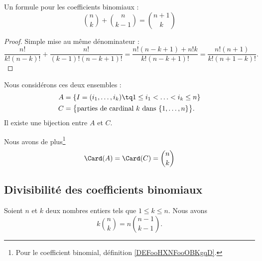 \begin{lemma}		\label{LEMooHWMNooIINsxu}
	Un formule pour les coefficients binomiaux :
	\begin{equation}
		{n\choose k}+{n\choose k-1}={n+1\choose k}
	\end{equation}
\end{lemma}

\begin{proof}
	Simple mise au même dénominateur :
	\begin{equation}
		\frac{ n! }{ k!(n-k)! }+\frac{ n! }{ (k-1)!(n-k+1)! }=\frac{ n!(n-k+1)+n!k }{ k!(n-k+1)! }=\frac{ n!(n+1) }{  k!(n+1-k)!  }.
	\end{equation}
\end{proof}

\begin{lemma}		\label{LEMooUTDTooXAmvdF}
	Nous considérons ces deux ensembles :
	\begin{subequations}
		\begin{align}
			A & =\{ I=(i_1,\ldots,i_k)\tq 1\leq i_1<\ldots <i_k\leq n \}                     \\
			C & =\big\{ \text{parties de cardinal \( k\) dans \( \{ 1,\ldots,n \}\)} \big\}.
		\end{align}
	\end{subequations}
	Il existe une bijection entre \( A\) et \( C\).

	Nous avons de plus\footnote{Pour le coefficient binomial, définition \ref{DEFooHXNFooOBKgqD}.}
	\begin{equation}        \label{EQooSPVNooHoPnOe}
		\Card(A)=\Card(C)={n\choose k}
	\end{equation}
\end{lemma}


\subsection{Divisibilité des coefficients binomiaux}

\begin{lemma}	\label{LEMooYBOIooEtVfDQ}
	Soient \( n\) et \( k\) deux nombres entiers tels que \( 1\leq k\leq n\). Nous avons
	\begin{equation}		\label{EQooDNBYooZfJEAe}
		k\binom{ n }{ k }=n\binom{ n-1 }{ k-1 }.
	\end{equation}
\end{lemma}

